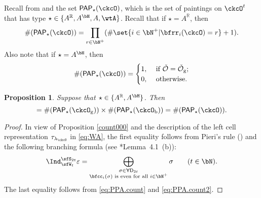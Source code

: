 \documentclass[12pt]{amsart}
\def\Im{\operatorname{Im}}
\newcommand{\CK}{{\mathcal {K}}}
\newcommand{\CO}{{\mathcal {O}}}
\newcommand{\sgn}{\operatorname{sgn}}
\newcommand{\R}{\mathbb R}
\numberwithin{equation}{section}
\newtheorem{prop}[thm]{Proposition}
\theoremstyle{remark}
\def\YD{\mathsf{YD}}
\def\lamck{\lambda_\ckcO}
\def\Wint#1{W_{[#1]}}
\def\Cint#1{\Coh_{[#1]}}
\def\PP{\mathsf{PAP}}
\def\Im{\mathrm{Im}}
\def\Coh{\mathrm{Coh}}
\def\ckcOb{\ckcO_{\mathrm b}}
\def\ckcOg{\ckcO_{\mathrm g}}
\begin{document}
Recall from  and   the set $\PP_{\star}(\ckcO)$, which is the set of paintings on $\ckcO^{t}$ that has type $\star\in \{A^\R, A^\bH, A, \wtA\}$.
Recall that if $\star=A^\R$, then
\begin{equation}\label{eq:PPA.count}
  \#(\PP_{\star}(\ckcO)) = \prod_{r\in \bN^{+}} (\#\set{i\in \bN^{+}| \bfrr_{i}(\ckcO)=r}+1).
\end{equation}
Also note that
if $\star=A^\bH$, then
\begin{equation}\label{eq:PPA.count2}
  \#(\PP_{\star}(\ckcO)) = \begin{cases}
   1,
    & \text{ if $\check \CO=\check \CO_\mathrm g$;}  \\
      0, & \text{ otherwise.} \\
    \end{cases}
\end{equation}

\begin{prop} \label{lem:GL.count2}
  Suppose that $\star \in\{A^\R, A^\bH\}$.  Then
   \begin{equation*}%
    [\tau_{\lamck}: \Cint{\Lambda}(\CK'(G))] = \# (\PP_{\star}(\ckcOg))\times
    \# (\PP_{\star}(\ckcOb)) = \# (\PP_{\star}(\ckcO)).
  \end{equation*}
\end{prop}
\begin{proof}
  In view of Proposition \ref{count000} and the description of the left cell representation $\tau_{\lamck}$ in \eqref{eq:WA}, the  first equality  follows from  Pieri's rule (\cite[Corollary 9.2.4]{GW}) and
  the following branching formula (see \cite{BV.W}*{Lemma~4.1~(b)}):
\begin{equation}\label{IndFor}
  \Ind_{\sfW_{t}}^{\sfS_{2t}} \varepsilon = \bigoplus_{\substack{\sigma\in \YD_{2t}\\
      \bfcc_{i}(\sigma) \text{ is even for all }i\in \bN^+}} \sigma\qquad (t\in \bN).
\end{equation}
The last equality
  follows from \eqref{eq:PPA.count} and \eqref{eq:PPA.count2}.
\end{proof}
\end{document}
